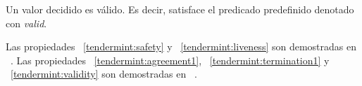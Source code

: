 \begin{property}[Validity]\label{tendermint:validity}
    Un valor decidido es válido. Es decir, satisface el predicado predefinido
    denotado con \textit{valid}.
\end{property}
%

Las propiedades ~\ref{tendermint:safety} y ~\ref{tendermint:liveness} son demostradas en ~\cite{Kwon2014TendermintC}.
Las propiedades ~\ref{tendermint:agreement1}, ~\ref{tendermint:termination1} y ~\ref{tendermint:validity}
son demostradas en ~\cite{Buchman.2018.Tendermint}.








